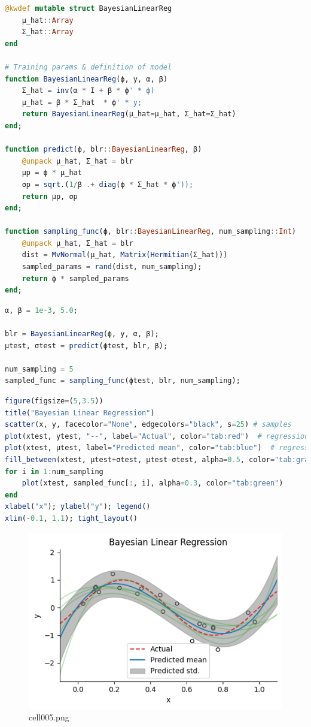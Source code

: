 \begin{lstlisting}[language=julia]
@kwdef mutable struct BayesianLinearReg
    μ_hat::Array
    Σ_hat::Array
end

# Training params & definition of model
function BayesianLinearReg(ϕ, y, α, β)
    Σ_hat = inv(α * I + β * ϕ' * ϕ)
    μ_hat = β * Σ_hat  * ϕ' * y;
    return BayesianLinearReg(μ_hat=μ_hat, Σ_hat=Σ_hat)
end;

function predict(ϕ, blr::BayesianLinearReg, β)
    @unpack μ_hat, Σ_hat = blr
    μp = ϕ * μ_hat
    σp = sqrt.(1/β .+ diag(ϕ * Σ_hat * ϕ'));
    return μp, σp
end;

function sampling_func(ϕ, blr::BayesianLinearReg, num_sampling::Int)
    @unpack μ_hat, Σ_hat = blr
    dist = MvNormal(μ_hat, Matrix(Hermitian(Σ_hat)))
    sampled_params = rand(dist, num_sampling);
    return ϕ * sampled_params 
end;
\end{lstlisting}
\begin{lstlisting}[language=julia]
α, β = 1e-3, 5.0;

blr = BayesianLinearReg(ϕ, y, α, β);
μtest, σtest = predict(ϕtest, blr, β);

num_sampling = 5
sampled_func = sampling_func(ϕtest, blr, num_sampling);
\end{lstlisting}
\begin{lstlisting}[language=julia]
figure(figsize=(5,3.5))
title("Bayesian Linear Regression")
scatter(x, y, facecolor="None", edgecolors="black", s=25) # samples
plot(xtest, ytest, "--", label="Actual", color="tab:red")  # regression line
plot(xtest, μtest, label="Predicted mean", color="tab:blue")  # regression line
fill_between(xtest, μtest+σtest, μtest-σtest, alpha=0.5, color="tab:gray", label="Predicted std.")
for i in 1:num_sampling
    plot(xtest, sampled_func[:, i], alpha=0.3, color="tab:green")
end
xlabel("x"); ylabel("y"); legend()
xlim(-0.1, 1.1); tight_layout()
\end{lstlisting}
\begin{figure}[ht]
	\centering
	\includegraphics[scale=0.8, max width=\linewidth]{./fig/bayesian-brain/bayesian-linear-regression/cell005.png}
	\caption{cell005.png}
	\label{cell005.png}
\end{figure}
